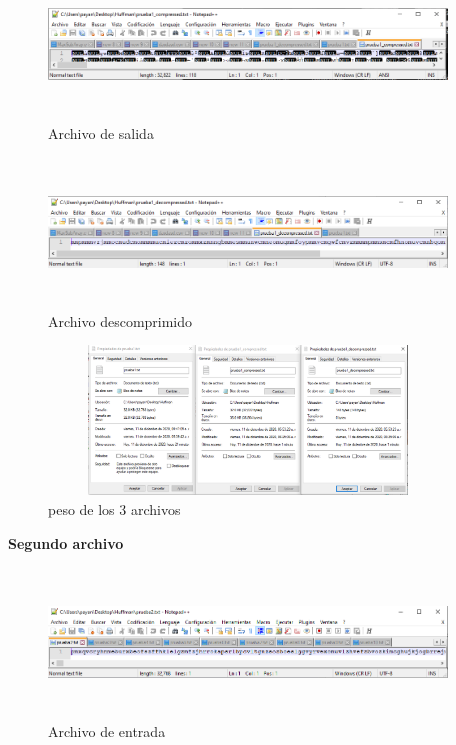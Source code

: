 \documentclass[spanish]{article}
\begin{document}
	\begin{figure}[H]
		\centering
		\includegraphics[width=400px,height=150px]{captura13}
		\caption{Archivo de salida}
	\end{figure}
	\begin{figure}[H]
		\centering
		\includegraphics[width=400px,height=150px]{captura14}
		\caption{Archivo descomprimido}
	\end{figure}
	\begin{figure}[H]
		\centering
		\includegraphics[width=400px,height=150px]{captura15}
		\caption{peso de los 3 archivos}
	\end{figure}
	\textbf{Segundo archivo}
	\begin{figure}[H]
		\centering
		\includegraphics[width=400px,height=150px]{captura16}
		\caption{Archivo de entrada}
	\end{figure}
\end{document}
